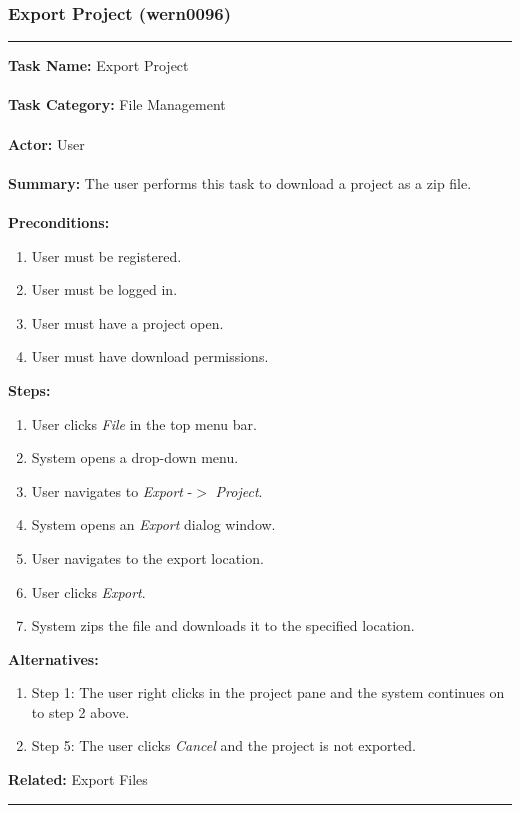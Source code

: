 \documentclass[11pt]{report}
\begin{document}
\newpage

\subsubsection{Export Project (wern0096)}
\vspace{2pt}
\hrule
\vspace{8pt}
	\noindent\textbf{Task Name:} Export Project \\ \\
	\textbf{Task Category:} File Management \\ \\
	\textbf{Actor:} User \\ \\
	\textbf{Summary:} The user performs this task to download a project as a zip file. \\ \\
	\textbf{Preconditions:} 
	\begin{enumerate}
		\item User must be registered.
		\item User must be logged in.
		\item User must have a project open.
		\item User must have download permissions.
	\end{enumerate}
	\textbf{Steps:}
	\begin{enumerate}
		\item User clicks \textit{File} in the top menu bar.
		\item System opens a drop-down menu.
		\item User navigates to \textit{Export} -$>$ \textit{Project}.
		\item System opens an \textit{Export} dialog window.
		\item User navigates to the export location.
		\item User clicks \textit{Export}.
		\item System zips the file and downloads it to the specified location.
	\end{enumerate}
	\textbf{Alternatives:} 
	\begin{enumerate}
		\item Step 1: The user right clicks in the project pane and the system continues on to step 2 above.
		\item Step 5: The user clicks \textit{Cancel} and the project is not exported.
	\end{enumerate}
	\textbf{Related:} Export Files
\hrule
\vspace{8pt}
\end{document}
